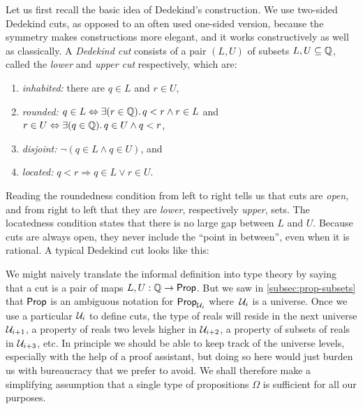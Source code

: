 Let us first recall the basic idea of Dedekind's construction. We use two-sided Dedekind
cuts, as opposed to an often used one-sided version, because the symmetry makes
constructions more elegant, and it works constructively as well as classically.
A \emph{Dedekind cut} consists of a pair $(L, U)$ of subsets $L, U \subseteq \mathbb{Q}$, called the
\emph{lower} and \emph{upper cut} respectively, which are:
% 
\begin{enumerate}
\item \emph{inhabited:} there are $q \in L$ and $r \in U$,
\item \emph{rounded:} $q \in L \Leftrightarrow \exis {r \in \Q} q < r \land r \in L$
  and $r \in U \Leftrightarrow \exis {q \in \Q} q \in U \land q < r$,
\item \emph{disjoint:} $\lnot (q \in L \land q \in U)$, and
\item \emph{located:} $q < r \Rightarrow q \in L \lor r \in U$.
\end{enumerate}
%
Reading the roundedness condition from left to right tells us that cuts are \emph{open},
and from right to left that they are \emph{lower}, respectively \emph{upper}, sets. The
locatedness condition states that there is no large gap between $L$ and $U$. Because cuts
are always open, they never include the ``point in between'', even when it is rational. A
typical Dedekind cut looks like this:
%
\begin{center}
\end{center}
%
We might naively translate the informal definition into type theory by saying that a cut
is a pair of maps $L, U : \mathbb{Q} \to \mathsf{Prop}$. But we saw in \autoref{subsec:prop-subsets} that
$\mathsf{Prop}$ is an ambiguous notation for $\mathsf{Prop}_{\mathcal{U}_i}$ where~$\mathcal{U}_i$ is a universe. Once we
use a particular $\mathcal{U}_i$ to define cuts, the type of reals will reside in the next
universe $\mathcal{U}_{i+1}$, a property of reals two levels higher in $\mathcal{U}_{i+2}$, a property of
subsets of reals in $\mathcal{U}_{i+3}$, etc. In principle we should be able to keep track of the
universe levels, especially with the help of a proof assistant, but doing so here would
just burden us with bureaucracy that we prefer to avoid. We shall therefore make a
simplifying assumption that a single type of propositions $\Omega$ is sufficient for all
our purposes.

